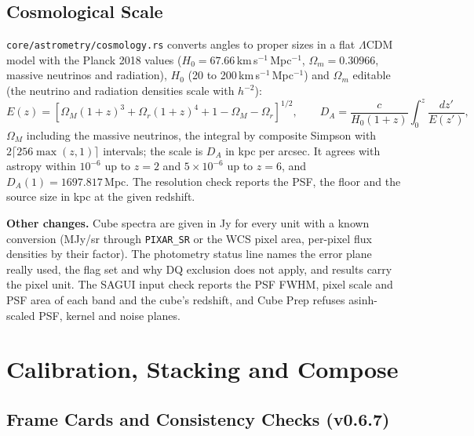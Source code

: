 \documentclass[11pt,a4paper]{article}
\newcommand{\code}[1]{\texttt{\small #1}}
\begin{document}
    \subsection{Cosmological Scale}
    \label{sec:cosmology}

    \code{core/astrometry/cosmology.rs} converts angles to proper sizes in a flat $\Lambda$CDM model with the Planck 2018 values ($H_0 = 67.66$\,km\,s$^{-1}$\,Mpc$^{-1}$, $\Omega_m = 0.30966$, massive neutrinos and radiation), $H_0$ (20 to 200\,km\,s$^{-1}$\,Mpc$^{-1}$) and $\Omega_m$ editable (the neutrino and radiation densities scale with $h^{-2}$):
    \begin{equation}
        E(z) = \left[\Omega_M (1 + z)^3 + \Omega_r (1 + z)^4 + 1 - \Omega_M - \Omega_r\right]^{1/2}, \qquad
        D_A = \frac{c}{H_0 (1 + z)} \int_0^z \frac{dz'}{E(z')},
    \end{equation}
    $\Omega_M$ including the massive neutrinos, the integral by composite Simpson with $2\lceil 256\max(z, 1)\rceil$ intervals; the scale is $D_A$ in kpc per arcsec. It agrees with astropy within $10^{-6}$ up to $z = 2$ and $5 \times 10^{-6}$ up to $z = 6$, and $D_A(1) = 1697.817$\,Mpc. The resolution check reports the PSF, the floor and the source size in kpc at the given redshift.

    \textbf{Other changes.} Cube spectra are given in Jy for every unit with a known conversion (MJy/sr through \code{PIXAR\_SR} or the WCS pixel area, per-pixel flux densities by their factor). The photometry status line names the error plane really used, the flag set and why DQ exclusion does not apply, and results carry the pixel unit. The SAGUI input check reports the PSF FWHM, pixel scale and PSF area of each band and the cube's redshift, and Cube Prep refuses asinh-scaled PSF, kernel and noise planes.

    \section{Calibration, Stacking and Compose}
    \label{sec:calstack}

    \subsection{Frame Cards and Consistency Checks (v0.6.7)}
\end{document}
